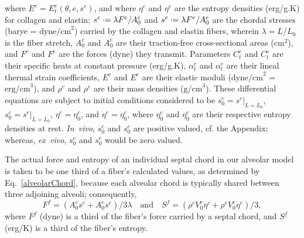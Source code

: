 where $E^e = E^e_t ( \theta , e , s^e )$, and where $\eta^c$ and $\eta^e$ are the entropy densities (erg/g.K) for collagen and elastin; $s^c \defeq \lambda F^c / A^c_0$ and $s^e \defeq \lambda F^e / A_0^e$ are the chordal stresses (barye = $\text{dyne/cm}^2$) carried by the collagen and elastin fibers, wherein $\lambda = L/L_0$ is the fiber stretch, $A^c_0$ and $A^e_0$ are their traction-free cross-sectional areas ($\text{cm}^2$), and $F^c$ and $F^e$ are the forces (dyne) they transmit.  Parameters $C^c_t$ and $C^e_t$ are their specific heats at constant pressure (erg/g.K), $\alpha^c_t$ and $\alpha^e_t$ are their lineal thermal strain coefficients, $E^e$ and $E^e$ are their elastic moduli ($\text{dyne/cm}^2$ = $\text{erg/cm}^3$), and $\rho^c$ and $\rho^e$ are their mass densities ($\text{g/cm}^3$).  These differential equations are subject to initial conditions considered to be $s^c_0 = s^c |_{L = L_0}$, $s^e_0 = s^e |_{L = L_0}$, $\eta^c = \eta^c_0$, and $\eta^e = \eta^e_0$, where  $\eta_0^c$ and $\eta_0^e$ are their respective entropy densities at rest.  \textit{In~vivo}, $s^c_0$ and $s^e_0$ are positive valued, cf. the Appendix; whereas, \textit{ex~vivo}, $s^c_0$ and $s^e_0$ would be zero valued.  

The actual force and entropy of an individual septal chord in our alveolar model is taken to be one third of a fiber's calculated values, as determined by Eq.~\ref{alveolarChord}, because each alveolar chord is typically shared between three adjoining alveoli; consequently, 
\begin{equation}
    \label{septalChordCEs}
    F^f = ( A_0^c s^c + A_0^e s^e ) / 3 \lambda 
    \quad \text{and} \quad
    S^f = ( \rho^c V_0^c \eta^c + \rho^e V_0^e \eta^e ) / 3, 
\end{equation}  
where $F^f$ (dyne) is a third of the fiber's force carried by a septal chord, and $S^f$ (erg/K) is a third of the fiber's entropy.

